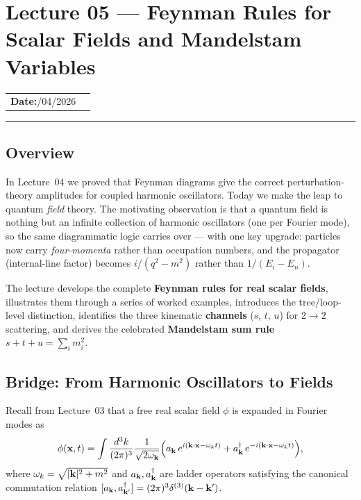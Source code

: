 \documentclass[../main.tex]{subfiles}
\begin{document}
\section{Lecture 05 — Feynman Rules for Scalar Fields and Mandelstam Variables}\label{sec:lec05:feynman-rules}
\begin{center}
\begin{tabular}{ll}
  \textbf{Date:}\quad 23/04/2026   & \\
\end{tabular}
\end{center}
\hrule\vspace{1.5em}
\subsection*{Overview}

In Lecture~04 we proved that Feynman diagrams give the correct perturbation-theory amplitudes for coupled harmonic oscillators.  Today we make the leap to quantum \emph{field} theory.  The motivating observation is that a quantum field is nothing but an infinite collection of harmonic oscillators (one per Fourier mode), so the same diagrammatic logic carries over — with one key upgrade: particles now carry \emph{four-momenta} rather than occupation numbers, and the propagator (internal-line factor) becomes $i/(q^2-m^2)$ rather than $1/(E_i - E_n)$.

The lecture develops the complete \textbf{Feynman rules for real scalar fields}, illustrates them through a series of worked examples, introduces the tree/loop-level distinction, identifies the three kinematic \textbf{channels} ($s$, $t$, $u$) for $2\to2$ scattering, and derives the celebrated \textbf{Mandelstam sum rule} $s + t + u = \sum_i m_i^2$.

\subsection*{Bridge: From Harmonic Oscillators to Fields}

Recall from Lecture~03 that a free real scalar field $\phi$ is expanded in Fourier modes as
\begin{equation}
  \phi(\mathbf{x}, t)
  = \int \frac{d^3k}{(2\pi)^3}
    \frac{1}{\sqrt{2\omega_{\mathbf{k}}}}
    \Bigl(
      a_{\mathbf{k}}\, e^{i(\mathbf{k}\cdot\mathbf{x} - \omega_k t)}
      + a_{\mathbf{k}}^\dagger\, e^{-i(\mathbf{k}\cdot\mathbf{x} - \omega_k t)}
    \Bigr),
  \label{eq:lec05:field-expansion}
\end{equation}
where $\omega_k = \sqrt{|\mathbf{k}|^2 + m^2}$ and $a_{\mathbf{k}}, a_{\mathbf{k}}^\dagger$ are ladder operators satisfying the canonical commutation relation $[a_{\mathbf{k}}, a_{\mathbf{k}'}^\dagger] = (2\pi)^3 \delta^{(3)}(\mathbf{k} - \mathbf{k}')$.
\end{document}
